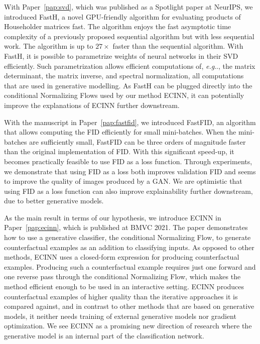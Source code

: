 \documentclass[11pt,a4paper,twoside,openright,final]{memoir}
\makeatletter
\DeclareRobustCommand\onedot{\futurelet\@let@token\@onedot}
\def\@onedot{\ifx\@let@token.\else.\null\fi\xspace}
\def\eg{\emph{e.g}\onedot} \def\Eg{\emph{E.g}\onedot}
\newcommand*{\paperref}[1]{Paper~\hyperref[#1]{\ref{#1}}}
\makeatother
\begin{document}
With \paperref{pap:svd}, which was published as a Spotlight paper at NeurIPS, we introduced FastH, a novel GPU-friendly algorithm for evaluating products of Householder matrices fast.
The algorithm enjoys the fast asymptotic time complexity of a previously proposed sequential algorithm but with less sequential work.
The algorithm is up to $27\times$ faster than the sequential algorithm.
With FastH, it is possible to parametrize weights of neural networks in their SVD efficiently.
Such parametrization allows efficient computations of, \eg, the matrix determinant, the matrix inverse, and spectral normalization, all computations that are used in generative modelling. 
As FastH can be plugged directly into the conditional Normalizing Flows used by our method ECINN, it can potentially improve the explanations of ECINN further downstream.

With the manuscript in \paperref{pap:fastfid}, we introduced FastFID, an algorithm that allows computing the FID efficiently for small mini-batches.
When the mini-batches are sufficiently small, FastFID can be three orders of magnitude faster than the original implementation of FID. 
With this significant speed-up, it becomes practically feasible to use FID as a loss function. 
Through experiments, we demonstrate that using FID as a loss both improves validation FID and seems to improve the quality of images produced by a GAN.
We are optimistic that using FID as a loss function can also improve explainability further downstream, due to better generative models.

As the main result in terms of our hypothesis, we introduce ECINN in \paperref{pap:ecinn}, which is published at BMVC 2021.
The paper demonstrates how to use a generative classifier, the conditional Normalizing Flow, to generate counterfactual examples as an addition to classifying inputs. 
As opposed to other methods, ECINN uses a closed-form expression for producing counterfactual examples.
Producing such a counterfactual example requires just one forward and one reverse pass through the conditional Normalizing Flow, which makes the method efficient enough to be used in an interactive setting. 
ECINN produces counterfactual examples of higher quality than the iterative approaches it is compared against, and in contrast to other methods that are based on generative models, it neither needs training of external generative models nor gradient optimization.
We see ECINN as a promising new direction of research where the generative model is an internal part of the classification network. 
\end{document}
